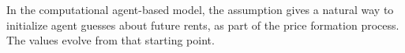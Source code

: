 In the computational agent-based  model, the assumption gives a natural way to initialize agent guesses about future rents, as part of the \gls{price formation} process. The values evolve from that starting point. 




